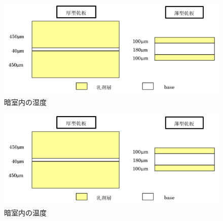 \documentclass[12pt,a4paper]{jarticle}
\begin{document}
\begin{figure}[htbp]
  \centering
    \includegraphics[width=140mm]{emulsionorder.png}
  \caption{暗室内の湿度\label{fig:darkroom_situdo}}
\end{figure}
\begin{figure}[htbp]
  \centering
    \includegraphics[width=140mm]{emulsionorder.png}
  \caption{暗室内の温度\label{fig:darkroom_onndo}}
\end{figure}
\end{document}

